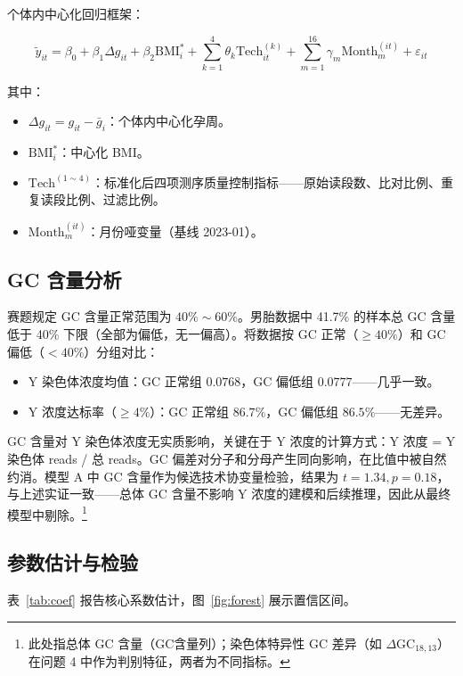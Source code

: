 \documentclass{internal-report}
\begin{document}
个体内中心化回归框架：

\begin{equation}
\tilde{y}_{it} = \beta_0 + \beta_1 \Delta g_{it} + \beta_2 \text{BMI}_i^* + \sum_{k=1}^{4} \theta_k \text{Tech}_{it}^{(k)} + \sum_{m=1}^{16} \gamma_m \text{Month}_m^{(it)} + \varepsilon_{it}
\label{eq:modelA}
\end{equation}

其中：
\begin{itemize}
    \item $\Delta g_{it} = g_{it} - \bar{g}_i$：个体内中心化孕周。
    \item $\text{BMI}_i^*$：中心化 BMI。
    \item $\text{Tech}^{(1\sim4)}$：标准化后四项测序质量控制指标——原始读段数、比对比例、重复读段比例、过滤比例。
    \item $\text{Month}_m^{(it)}$：月份哑变量（基线 2023-01）。
\end{itemize}

\subsection{GC 含量分析}

赛题规定 GC 含量正常范围为 $40\%\sim60\%$。男胎数据中 41.7\% 的样本总 GC 含量低于 40\% 下限（全部为偏低，无一偏高）。将数据按 GC 正常（$\geq 40\%$）和 GC 偏低（$<40\%$）分组对比：

\begin{itemize}
    \item Y 染色体浓度均值：GC 正常组 $0.0768$，GC 偏低组 $0.0777$——几乎一致。
    \item Y 浓度达标率（$\geq 4\%$）：GC 正常组 $86.7\%$，GC 偏低组 $86.5\%$——无差异。
\end{itemize}

GC 含量对 Y 染色体浓度无实质影响，关键在于 Y 浓度的计算方式：Y 浓度 = Y 染色体 reads / 总 reads。GC 偏差对分子和分母产生同向影响，在比值中被自然约消。模型 A 中 GC 含量作为候选技术协变量检验，结果为 $t=1.34, p=0.18$，与上述实证一致——总体 GC 含量不影响 Y 浓度的建模和后续推理，因此从最终模型中剔除。\footnote{此处指总体 GC 含量（GC含量列）；染色体特异性 GC 差异（如 $\Delta$GC$_{18,13}$）在问题 4 中作为判别特征，两者为不同指标。}

\subsection{参数估计与检验}

表~\ref{tab:coef} 报告核心系数估计，图~\ref{fig:forest} 展示置信区间。
\end{document}
